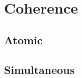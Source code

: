 \chapter{Coherence}
\label{chap:coherence}

\section{Atomic}
\label{sec:atomic}

\section{Simultaneous}
\label{sec:simultaneous}



